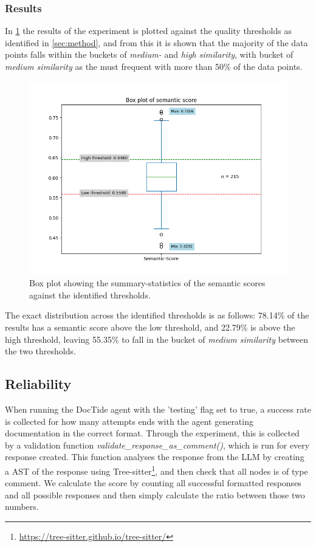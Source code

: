\subsubsection{Results}
In \cref{fig:sem_box} the results of the experiment is plotted against the quality thresholds as identified in \cref{sec:method}, and from this it is shown that the majority of the data points falls within the buckets of \textit{medium-} and \textit{high similarity}, with bucket of \textit{medium similarity} as the must frequent with more than 50\% of the data points.

\label{sec:sem_results}
\begin{figure}[H]
\centering
\includegraphics[width=0.7\linewidth]{Figures/semantic_score_box_plot.png}
\caption{Box plot showing the summary-statistics of the semantic scores against the identified thresholds.}
\label{fig:sem_box}
\end{figure}

\noindent
The exact distribution across the identified thresholds is as follows: 78.14\% of the results has a semantic score above the low threshold, and 22.79\% is above the high threshold, leaving 55.35\% to fall in the bucket of \textit{medium similarity} between the two thresholds.

\subsection{Reliability}
When running the DocTide agent with the 'testing' flag set to true, a success rate is collected for how many attempts ends with the agent generating documentation in the correct format.
Through the experiment, this is collected by a validation function \textit{validate\_response\_as\_comment()}, which is run for every response created. This function analyses the response from the LLM by creating a AST of the response using Tree-sitter\footnote{\url{https://tree-sitter.github.io/tree-sitter/}}, and then check that all nodes is of type comment.
We calculate the score by counting all successful formatted responses and all possible responses and then simply calculate the ratio between those two numbers.
